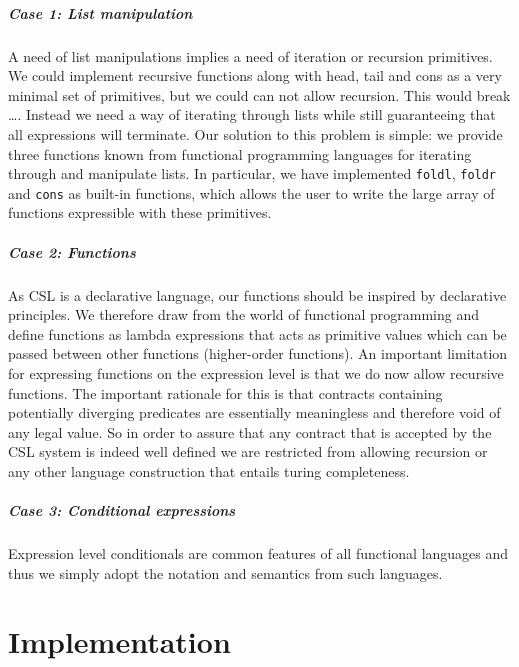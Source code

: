\documentclass[10pt,a4paper,final,oneside,openany,article]{memoir}
\begin{document}
\paragraph{Case 1: List manipulation}
A need of list manipulations implies a need of iteration or recursion
primitives. We could implement recursive functions along with head,
tail and cons as a very minimal set of primitives, but we could can
not allow recursion. This would break \ldots {}.  Instead we need a way of iterating through lists
while still guaranteeing that all expressions will terminate.  Our
solution to this problem is simple: we provide three functions known
from functional programming languages for iterating through and
manipulate lists. In particular, we have implemented
\lstinline{foldl}, \lstinline{foldr} and \lstinline{cons} as built-in
functions, which allows the user to write the large array of functions
expressible with these primitives.

\paragraph{Case 2: Functions} As CSL is a declarative language, our
functions should be inspired by declarative principles. We therefore
draw from the world of functional programming and define functions as
lambda expressions that acts as primitive values which can be passed
between other functions (higher-order functions). An important
limitation for expressing functions on the expression level is that we
do now allow recursive functions. The important rationale for this is
that contracts containing potentially diverging predicates are
essentially meaningless and therefore void of any legal value. So in
order to assure that any contract that is accepted by the CSL system
is indeed well defined we are restricted from allowing recursion or
any other language construction that entails turing completeness.

\paragraph{Case 3: Conditional expressions}
Expression level conditionals are common features of all functional
languages and thus we simply adopt the notation and semantics from
such languages.

\newpage
\chapter{Implementation}
\label{implementation}
\end{document}
